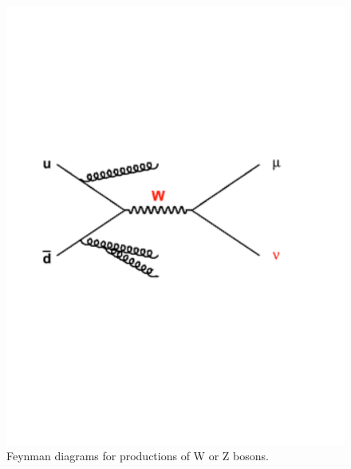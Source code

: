 \begin{figure}[h]
\centering\includegraphics[scale=0.2]{./protonprotoncollisions/Pictures/wz2.pdf}
\caption{Feynman diagrams for productions of W or Z bosons.}
\label{fig:wzfeyn}
\end{figure}


